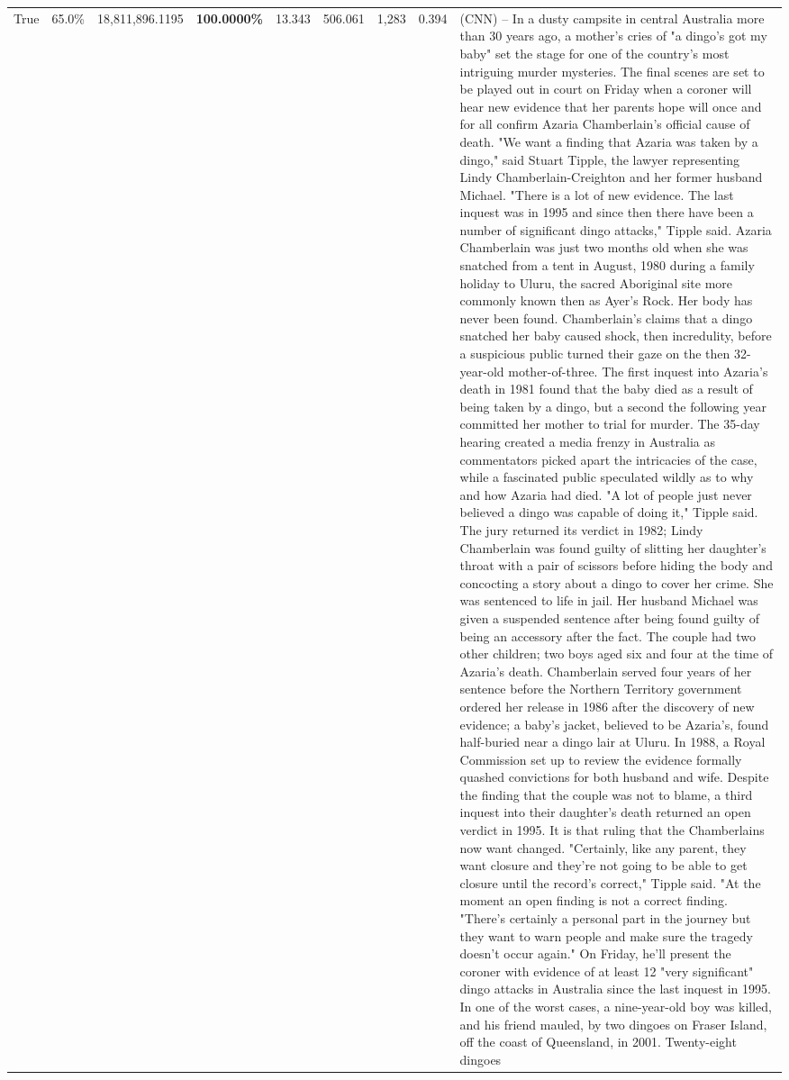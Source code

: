 \begin{table}[H]
\begin{tabular}{lllrlllll}
True & 65.0\% & 18,811,896.1195 & \bfseries \color{red} 100.0000\% & 13.343 & 506.061 & 1,283 & 0.394 & (CNN) -- In a dusty campsite in central Australia more than 30 years ago, a mother's cries of "a dingo's got my baby" set the stage for one of the country's most intriguing murder mysteries. The final scenes are set to be played out in court on Friday when a coroner will hear new evidence that her parents hope will once and for all confirm Azaria Chamberlain's official cause of death. "We want a finding that Azaria was taken by a dingo," said Stuart Tipple, the lawyer representing Lindy Chamberlain-Creighton and her former husband Michael. "There is a lot of new evidence. The last inquest was in 1995 and since then there have been a number of significant dingo attacks," Tipple said. Azaria Chamberlain was just two months old when she was snatched from a tent in August, 1980 during a family holiday to Uluru, the sacred Aboriginal site more commonly known then as Ayer's Rock. Her body has never been found. Chamberlain's claims that a dingo snatched her baby caused shock, then incredulity, before a suspicious public turned their gaze on the then 32-year-old mother-of-three. The first inquest into Azaria's death in 1981 found that the baby died as a result of being taken by a dingo, but a second the following year committed her mother to trial for murder. The 35-day hearing created a media frenzy in Australia as commentators picked apart the intricacies of the case, while a fascinated public speculated wildly as to why and how Azaria had died. "A lot of people just never believed a dingo was capable of doing it," Tipple said. The jury returned its verdict in 1982; Lindy Chamberlain was found guilty of slitting her daughter's throat with a pair of scissors before hiding the body and concocting a story about a dingo to cover her crime. She was sentenced to life in jail. Her husband Michael was given a suspended sentence after being found guilty of being an accessory after the fact. The couple had two other children; two boys aged six and four at the time of Azaria's death. Chamberlain served four years of her sentence before the Northern Territory government ordered her release in 1986 after the discovery of new evidence; a baby's jacket, believed to be Azaria's, found half-buried near a dingo lair at Uluru. In 1988, a Royal Commission set up to review the evidence formally quashed convictions for both husband and wife. Despite the finding that the couple was not to blame, a third inquest into their daughter's death returned an open verdict in 1995. It is that ruling that the Chamberlains now want changed. "Certainly, like any parent, they want closure and they're not going to be able to get closure until the record's correct," Tipple said. "At the moment an open finding is not a correct finding. "There's certainly a personal part in the journey but they want to warn people and make sure the tragedy doesn't occur again." On Friday, he'll present the coroner with evidence of at least 12 "very significant" dingo attacks in Australia since the last inquest in 1995. In one of the worst cases, a nine-year-old boy was killed, and his friend mauled, by two dingoes on Fraser Island, off the coast of Queensland, in 2001. Twenty-eight dingoes 
\end{tabular}
\end{table}
